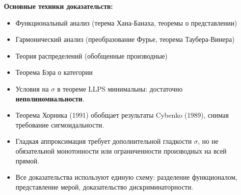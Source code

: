\documentclass[../NDCNNAI_main.tex]{subfiles}
\begin{document}
\textbf{Основные техники доказательств:}
\begin{itemize}
    \item Функциональный анализ (терема Хана-Банаха, теоремы о представлении)
    \item Гармонический анализ (преобразование Фурье, теорема Таубера-Винера)
    \item Теория распределений (обобщенные производные)
    \item Теорема Бэра о категории
\end{itemize}

\begin{remarks}
    \leavevmode
    \begin{itemize}
        \item Условия на $\sigma$ в теореме LLPS минимальны: достаточно \textbf{неполиномиальности}.
        \item Теорема Хорника (1991) обобщает результаты Cybenko (1989), снимая требование сигмоидальности.
        \item Гладкая аппроксимация требует дополнительной гладкости $\sigma$, но не обязательной монотонности или ограниченности производных на всей прямой.
        \item Все доказательства используют единую схему: разделение функционалом, представление мерой, доказательство дискриминаторности.
    \end{itemize}
\end{remarks}
\end{document}
